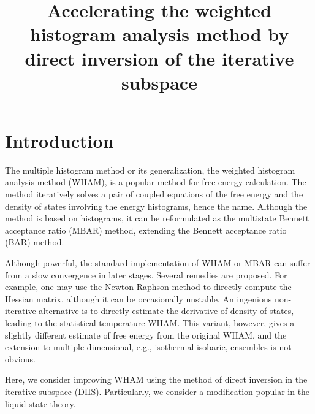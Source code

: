 \documentclass[aip,jcp,preprint,superscriptaddress]{revtex4-1}
\begin{document}
\newcommand{\vct}[1]{\mathbf{#1}}
\newcommand{\vx}{\vct{x}}
\newcommand{\Z}{\mathcal{Z}}
\newcommand{\E}{\mathcal{E}}




\title{Accelerating the weighted histogram analysis method
by direct inversion of the iterative subspace}

\maketitle



\section{Introduction}





The multiple histogram method\cite{
ferrenberg1988, *ferrenberg1989}
or its generalization,
the weighted histogram analysis method (WHAM)\cite{
kumar1992, souaille2001, kastner2005,
chodera2007, bereau2009,
kim2011},
is a popular method
for free energy calculation.
%
The method iteratively solves a pair of coupled equations of
the free energy and the density of states
involving the energy histograms, hence the name.
%
Although the method is based on histograms,
it can be reformulated as the
multistate Bennett acceptance ratio (MBAR) method\cite{
shirts2008},
extending the Bennett acceptance ratio (BAR) method\cite{
bennett1976}.



Although powerful,
the standard implementation of WHAM or MBAR can suffer from
a slow convergence in later stages.
%
Several remedies are proposed\cite{
 shirts2008, bereau2009, kim2011}.
%
For example, one may use the Newton-Raphson method
to directly compute the Hessian matrix\cite{
shirts2008},
although it can be occasionally unstable.
%
An ingenious non-iterative alternative
is to directly estimate the derivative of density of states,
leading to the statistical-temperature WHAM\cite{
kim2011}.
%
This variant, however, gives
a slightly different estimate of free energy
from the original WHAM,
and the extension to multiple-dimensional,
e.g., isothermal-isobaric, ensembles
is not obvious.



Here, we consider improving WHAM using
the method of direct inversion in the iterative subspace (DIIS)\cite{
pulay1980, *pulay1982, *hamilton1986}.
%
Particularly, we consider a modification
popular in the liquid state theory\cite{
kovalenko1999, howard2011}.
\end{document}
